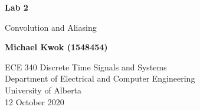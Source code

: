 \documentclass{article}
\begin{document}
\begin{titlepage}
    \begin{center}
        \vspace*{1cm}

        \huge{\textbf{Lab 2}}

        \vspace{0.5cm}

        \LARGE{Convolution and Aliasing}
        \vspace{5cm}

        \Large{\textbf{Michael Kwok (1548454)}}

        \vfill
        ECE 340 Discrete Time Signals and Systems\\
        Department of Electrical and Computer Engineering\\
        University of Alberta\\
        12 October 2020
    \end{center}
\end{titlepage}
\end{document}
